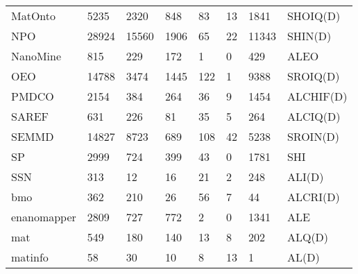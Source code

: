 \begin{table}
\begin{tabular}{m{3.5cm}|m{1cm}m{1cm}m{1cm}m{1cm}m{1cm}m{1cm}m{1cm}}
MatOnto                 &      5235 &              2320 &        848 &                   83 &                     13 &                     1841 &         SHOIQ(D) \\
NPO                     &     28924 &             15560 &       1906 &                   65 &                     22 &                    11343 &          SHIN(D) \\
NanoMine                &       815 &               229 &        172 &                    1 &                      0 &                      429 &             ALEO \\
OEO                     &     14788 &              3474 &       1445 &                  122 &                      1 &                     9388 &         SROIQ(D) \\
PMDCO                   &      2154 &               384 &        264 &                   36 &                      9 &                     1454 &        ALCHIF(D) \\
SAREF                   &       631 &               226 &         81 &                   35 &                      5 &                      264 &         ALCIQ(D) \\
SEMMD                   &     14827 &              8723 &        689 &                  108 &                     42 &                     5238 &         SROIN(D) \\
SP                      &      2999 &               724 &        399 &                   43 &                      0 &                     1781 &              SHI \\
SSN                     &       313 &                12 &         16 &                   21 &                      2 &                      248 &           ALI(D) \\
bmo                     &       362 &               210 &         26 &                   56 &                      7 &                       44 &         ALCRI(D) \\
enanomapper             &      2809 &               727 &        772 &                    2 &                      0 &                     1341 &              ALE \\
mat                     &       549 &               180 &        140 &                   13 &                      8 &                      202 &           ALQ(D) \\
matinfo                 &        58 &                30 &         10 &                    8 &                     13 &                        1 &            AL(D) \\

\end{tabular}
\end{table}
